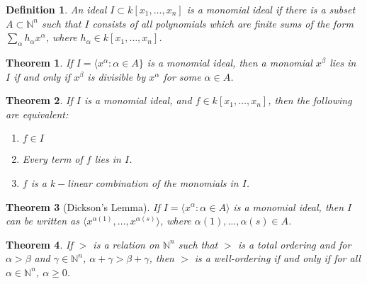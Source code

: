 \documentclass{article}
\theoremstyle{mystyle}
\newtheorem{theorem}{Theorem}[section]
\newtheorem{definition}{Definition}[section]
\begin{document}
\begin{definition}
An ideal $I\subset k[x_1,\hdots ,x_n]$ is a monomial ideal if there is a subset $A\subset \mathbb{N}^n$ such that $I$ consists of all polynomials which are finite sums of the form $\sum_{\alpha} h_{\alpha} x^\alpha$, where $h_{\alpha} \in k[x_1,\hdots ,x_n]$. 
\end{definition}
\begin{theorem}
If $I=\langle x^\alpha: \alpha \in A\}$ is a monomial ideal, then a monomial $x^\beta$ lies in $I$ if and only if $x^\beta$ is divisible by $x^\alpha$ for some $\alpha \in A$.
\end{theorem}
\begin{theorem}
If $I$ is a monomial ideal, and $f\in k[x_1,\hdots ,x_n]$, then the following are equivalent:
\begin{enumerate}
        \item $f\in I$
        \item Every term of $f$ lies in $I$.
        \item $f$ is a $k-$linear combination of the monomials in $I$.
\end{enumerate}
\end{theorem}
\begin{theorem}[Dickson's Lemma]
If $I=\langle x^\alpha: \alpha \in A\rangle$ is a monomial ideal, then $I$ can be written as $\langle x^{\alpha(1)}, \hdots, x^{\alpha(s)}\rangle$, where $\alpha(1),\hdots, \alpha(s) \in A$. 
\end{theorem}
\begin{theorem}
If $>$ is a relation on $\mathbb{N}^n$ such that $>$ is a total ordering and for $\alpha>\beta$ and $\gamma\in \mathbb{N}^n$, $\alpha+\gamma>\beta+\gamma$, then $>$ is a well-ordering if and only if for all $\alpha \in \mathbb{N}^n$, $\alpha \geq 0$.
\end{theorem}
\end{document}
